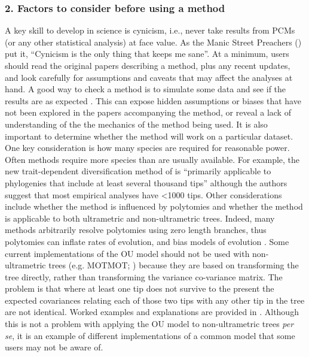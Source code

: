 \documentclass[a4paper,12pt]{article}
\begin{document}
  \subsubsection{2. Factors to consider before using a method}
    A key skill to develop in science is cynicism, i.e., never take results from PCMs (or any other statistical analysis) at face value.
    As the Manic Street Preachers (\citeyear{manics}) put it, ``Cynicism is the only thing that keeps me sane''.
    At a minimum, users should read the original papers describing a method, plus any recent updates, and look carefully for assumptions and caveats that may affect the analyses at hand.
    A good way to check a method is to simulate some data and see if the results are as expected \citep[e.g.][]{boettiger2012your}. 
    This can expose hidden assumptions or biases that have not been explored in the papers accompanying the method, or reveal a lack of understanding of the the mechanics of the method being used. 
    It is also important to determine whether the method will work on a particular dataset.
    One key consideration is how many species are required for reasonable power. 
    Often methods require more species than are usually available. For example, the new trait-dependent diversification method of \citet{rabosky2015robust} is ``primarily applicable to phylogenies that include at least several thousand tips'' although the authors suggest that most empirical analyses have \textless 1000 tips. 
    Other considerations include whether the method is influenced by polytomies and whether the method is applicable to both ultrametric and non-ultrametric trees. 
    Indeed, many methods arbitrarily resolve polytomies using zero length branches, thus polytomies can inflate rates of evolution, and bias models of evolution  \citep{cooper2010body}. 
    Some current implementations of the OU model should not be used with non-ultrametric trees (e.g. MOTMOT; \citealp{Thomas:2011aa}) because they are based on transforming the tree directly, rather than transforming the variance co-variance matrix. 
    The problem is that where at least one tip does not survive to the present the expected covariances relating each of those two tips with any other tip in the tree are not identical. 
    Worked examples and explanations are provided in \citep{slater2014correction}. 
    Although this is not a problem with applying the OU model to non-ultrametric trees \textit{per se}, it is an example of different implementations of a common model that some users may not be aware of. 
\end{document}
